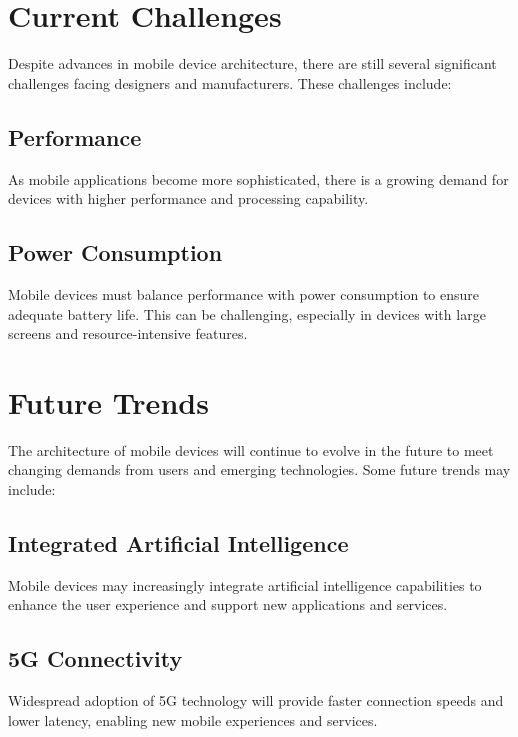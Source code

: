 \documentclass[journal]{IEEEtran}
\begin{document}
	\section{Current Challenges}
	Despite advances in mobile device architecture, there are still several significant challenges facing designers and manufacturers. These challenges include:
	
	\subsection{Performance}
	As mobile applications become more sophisticated, there is a growing demand for devices with higher performance and processing capability.
	
	\subsection{Power Consumption}
	Mobile devices must balance performance with power consumption to ensure adequate battery life. This can be challenging, especially in devices with large screens and resource-intensive features.
	
	\section{Future Trends}
	The architecture of mobile devices will continue to evolve in the future to meet changing demands from users and emerging technologies. Some future trends may include:
	
	\subsection{Integrated Artificial Intelligence}
	Mobile devices may increasingly integrate artificial intelligence capabilities to enhance the user experience and support new applications and services.
	
	\subsection{5G Connectivity}
	Widespread adoption of 5G technology will provide faster connection speeds and lower latency, enabling new mobile experiences and services.
	
	
	
	
\end{document}
